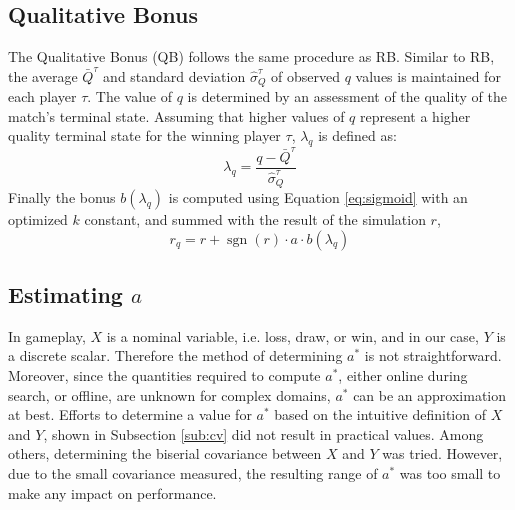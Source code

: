 \documentclass{ecai2014}
\newcommand{\sgn}{\mathop{\mathrm{sgn}}}
\begin{document}
\subsection{Qualitative Bonus}
\label{subsec:qb}
The Qualitative Bonus (QB) follows the same procedure as RB. Similar to RB, the average $\bar{Q}^\tau$ and standard deviation $\hat{\sigma}^\tau_Q$ of observed $q$ values is maintained for each player $\tau$. The value of $q$ is determined by an assessment of the quality of the match's terminal state. Assuming that higher values of $q$ represent a higher quality terminal state for the winning player $\tau$, $\lambda_q$ is defined as:
\begin{equation}
\lambda_q = \frac{q - \bar{Q}^\tau}{\hat{\sigma}^\tau_Q}
\label{eq:qb_norm}
\end{equation}
Finally the bonus $b(\lambda_q)$ is computed using Equation \ref{eq:sigmoid} with an optimized $k$ constant, and summed with the result of the simulation $r$,
\begin{equation}
r_q=r+\sgn(r) \cdot a \cdot b(\lambda_q)
\label{eq:qb}
\end{equation}

\subsection{Estimating $a$}
\label{subsec:astar}
In gameplay, $X$ is a nominal variable, i.e. loss, draw, or win, and in our case, $Y$ is a discrete scalar. Therefore the method of determining $a^*$ is not straightforward. Moreover, since the quantities required to compute $a^*$, either online during search, or offline, are unknown for complex domains, $a^*$ can be an approximation at best. 
Efforts to determine a value for $a^*$ based on the intuitive definition of $X$ and $Y$, shown in Subsection \ref{sub:cv} did not result in practical values. Among others, determining the biserial covariance between $X$ and $Y$ was tried. However, due to the small covariance measured, the resulting range of $a^*$ was too small to make any impact on performance.

\end{document}
